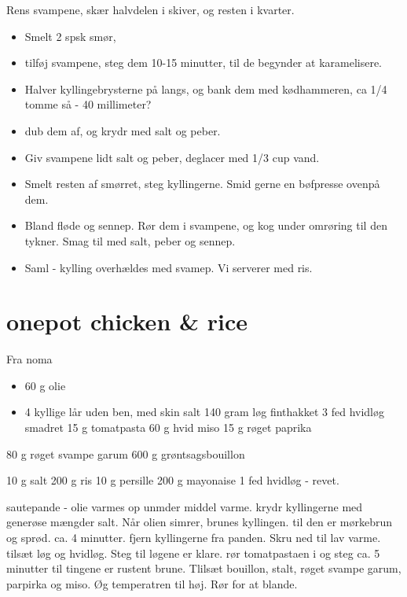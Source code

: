 \documentclass[
]{book}
\providecommand{\tightlist}{%
  \setlength{\itemsep}{0pt}\setlength{\parskip}{0pt}}
\begin{document}
Rens svampene, skær halvdelen i skiver, og resten i kvarter.

\begin{itemize}
\tightlist
\item
  Smelt 2 spsk smør,
\item
  tilføj svampene, steg dem 10-15 minutter, til
  de begynder at karamelisere.
\item
  Halver kyllingebrysterne på langs,
  og bank dem med kødhammeren, ca 1/4 tomme så - 40 millimeter?
\item
  dub dem af, og krydr med salt og peber.
\item
  Giv svampene lidt salt og peber, deglacer med 1/3 cup vand.
\item
  Smelt resten af smørret, steg kyllingerne. Smid gerne en
  bøfpresse ovenpå dem.
\item
  Bland fløde og sennep. Rør dem i svampene, og kog under omrøring
  til den tykner. Smag til med salt, peber og sennep.
\item
  Saml - kylling overhældes med svamep. Vi serverer med ris.
\end{itemize}

\chapter{onepot chicken \& rice}\label{onepot-chicken-rice}

Fra noma

\begin{itemize}
\tightlist
\item
  60 g olie
\item
  4 kyllige lår uden ben, med skin
  salt
  140 gram løg finthakket
  3 fed hvidløg smadret
  15 g tomatpasta
  60 g hvid miso
  15 g røget paprika
\end{itemize}

80 g røget svampe garum
600 g grøntsagsbouillon

10 g salt
200 g ris
10 g persille
200 g mayonaise
1 fed hvidløg - revet.

sautepande - olie varmes op unmder middel varme. krydr kyllingerne med generøse mængder
salt. Når olien simrer, brunes kyllingen. til den er mørkebrun og sprød. ca. 4 minutter.
fjern kyllingerne fra panden. Skru ned til lav varme.
tilsæt løg og hvidløg. Steg til løgene er klare.
rør tomatpastaen i og steg ca. 5 minutter til tingene er rustent brune.
Tlilsæt bouillon, stalt, røget svampe garum, parpirka og miso. Øg temperatren til høj. Rør for at
blande.
\end{document}
